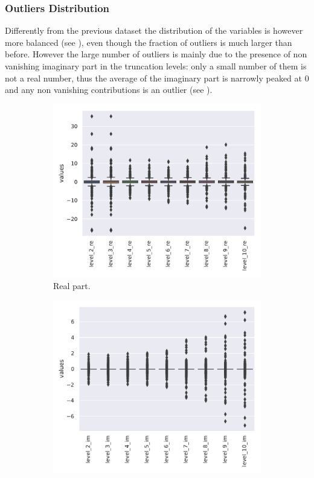 \subsubsection{Outliers Distribution}

Differently from the previous dataset the distribution of the variables is however more balanced (see ), even though the fraction of outliers is much larger than before.
However the large number of outliers is mainly due to the presence of non vanishing imaginary part in the truncation levels: only a small number of them is not a real number, thus the average of the imaginary part is narrowly peaked at 0 and any non vanishing contributions is an outlier (see ).

\begin{figure}[htbp]
  \centering
  \begin{subfigure}{0.45\textwidth}
    \centering
    \includegraphics[width=\linewidth]{img/var_box_re}
    \caption{Real part.}
  \end{subfigure}
  \begin{subfigure}{0.45\textwidth}
    \centering
    \includegraphics[width=\linewidth]{img/var_box_im}

\end{subfigure}
\end{figure}

